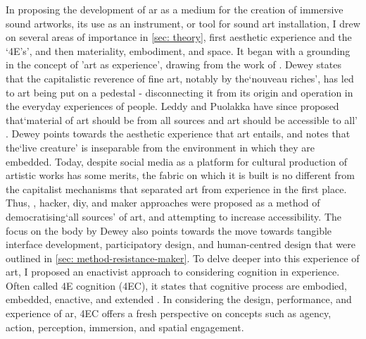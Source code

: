 In proposing the development of \gls{ar} as a medium for the creation of immersive sound artworks, its use as an instrument, or tool for sound art installation, I drew on several areas of importance in \autoref{sec: theory}, first aesthetic experience and the `4E's', and then materiality, embodiment, and space. It began with a grounding in the concept of 'art as experience', drawing from the work of \citep{dewey1934}. Dewey states that the capitalistic reverence of fine art, notably by the`nouveau riches', has led to art being put on a pedestal - disconnecting it from its origin and operation in the everyday experiences of people. Leddy and Puolakka have since proposed that`material of art should be from all sources and art should be accessible to all' \citeyearpar{leddy2021}. Dewey points towards the aesthetic experience that art entails, and notes that the`live creature' is inseparable from the environment in which they are embedded. Today, despite social media as a platform for cultural production of artistic works has some merits, the fabric on which it is built is no different from the capitalist mechanisms that separated art from experience in the first place. Thus, , hacker, \gls{diy}, and maker approaches were proposed as a method of democratising`all sources' of art, and attempting to increase accessibility. The focus on the body by Dewey also points towards the move towards tangible interface development, participatory design, and human-centred design that were outlined in \autoref{sec: method-resistance-maker}. To delve deeper into this experience of art, I proposed an enactivist approach to considering cognition in experience. Often called 4E cognition (4EC), it states that cognitive process are embodied, embedded, enactive, and extended \citep{gallagher2017}. In considering the design, performance, and experience of \gls{ar}, 4EC offers a fresh perspective on concepts such as agency, action, perception, immersion, and spatial engagement.

